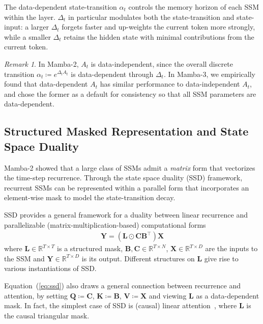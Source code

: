 \documentclass{article}
\newcommand{\citep}{\parencite}
\def\Eqref#1{Equation~(\ref{#1})}
\def\bB{{\bm{B}}}
\def\bC{{\bm{C}}}
\def\bK{{\bm{K}}}
\def\bL{{\bm{L}}}
\def\bQ{{\bm{Q}}}
\def\bV{{\bm{V}}}
\def\bX{{\bm{X}}}
\def\bY{{\bm{Y}}}
\theoremstyle{plain}
\theoremstyle{definition}
\theoremstyle{remark}
\newtheorem{remark}{Remark}
\begin{document}
The data-dependent state-transition $\alpha_t$ controls the memory horizon of each SSM within the layer.
$\Delta_t$ in particular modulates both the state-transition and state-input: a larger $\Delta_t$ forgets faster and up-weights the current token more strongly, while a smaller $\Delta_t$ retains the hidden state with minimal contributions from the current token.

\begin{remark}
In Mamba-2, $A_t$ is data-independent, since the overall discrete transition $\alpha_t \coloneqq e^{\Delta_t A_t}$ is data-dependent through $\Delta_t$.
In Mamba-3, we empirically found that data-dependent $A_t$ has similar performance to data-independent $A_t$, and chose the former as a default for consistency so that all SSM parameters are data-dependent.
\end{remark}

\subsection{Structured Masked Representation and State Space Duality}
\label{sec:prelim-sma}
Mamba-2 showed that a large class of SSMs admit a \emph{matrix} form that vectorizes the time-step recurrence.
Through the state space duality (SSD) framework, recurrent SSMs can be represented within a parallel form that incorporates an element-wise mask to model the state-transition decay.

SSD provides a general framework for a duality between linear recurrence and parallelizable (matrix-multiplication-based) computational forms
\begin{align}
    \bY 
    =
    (   \bL
        \odot 
        \bC {\bB}^{\top}
    )\bX
    \label{eq:ssd}
\end{align}
where $\bL \in \mathbb{R}^{T \times T}$ is a structured mask,
$\bB,\bC \in \mathbb{R}^{T \times N}$, $\bX \in \mathbb{R}^{T \times D}$ are the inputs to the SSM and $\bY \in \mathbb{R}^{T \times D}$ is its output.
Different structures on $\bL$ give rise to various instantiations of SSD.

\Eqref{eq:ssd} also draws a general connection between recurrence and attention, 
by setting $\bQ\coloneqq\bC$, $\bK\coloneqq\bB$, $\bV\coloneqq\bX$ and viewing $\bL$ as a data-dependent mask.
In fact, the simplest case of SSD is (causal) linear attention~\citep{linearattention}, where $\bL$ is the causal triangular mask.
\end{document}
